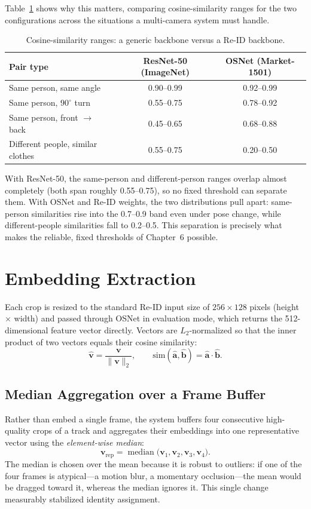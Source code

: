 \documentclass[12pt]{report}
\begin{document}
Table~\ref{tab:osnet_dist} shows why this matters, comparing cosine-similarity ranges for the two configurations across the situations a multi-camera system must handle.

\begin{table}[H]
\centering
\begin{tabularx}{\textwidth}{|X|c|c|}
\hline
\textbf{Pair type} & \textbf{ResNet-50 (ImageNet)} & \textbf{OSNet (Market-1501)} \\
\hline
Same person, same angle & 0.90--0.99 & 0.92--0.99 \\
\hline
Same person, $90^{\circ}$ turn & 0.55--0.75 & 0.78--0.92 \\
\hline
Same person, front $\rightarrow$ back & 0.45--0.65 & 0.68--0.88 \\
\hline
Different people, similar clothes & 0.55--0.75 & 0.20--0.50 \\
\hline
\end{tabularx}
\caption{Cosine-similarity ranges: a generic backbone versus a Re-ID backbone.}
\label{tab:osnet_dist}
\end{table}

With ResNet-50, the same-person and different-person ranges overlap almost completely (both span roughly 0.55--0.75), so no fixed threshold can separate them. With OSNet and Re-ID weights, the two distributions pull apart: same-person similarities rise into the 0.7--0.9 band even under pose change, while different-people similarities fall to 0.2--0.5. This separation is precisely what makes the reliable, fixed thresholds of Chapter~6 possible.

\section{Embedding Extraction}
Each crop is resized to the standard Re-ID input size of $256 \times 128$ pixels (height $\times$ width) and passed through OSNet in evaluation mode, which returns the 512-dimensional feature vector directly. Vectors are $L_2$-normalized so that the inner product of two vectors equals their cosine similarity:
\[
\hat{\mathbf{v}} = \frac{\mathbf{v}}{\lVert \mathbf{v} \rVert_2}, \qquad
\text{sim}(\hat{\mathbf{a}}, \hat{\mathbf{b}}) = \hat{\mathbf{a}} \cdot \hat{\mathbf{b}} .
\]

\subsection{Median Aggregation over a Frame Buffer}
Rather than embed a single frame, the system buffers four consecutive high-quality crops of a track and aggregates their embeddings into one representative vector using the \emph{element-wise median}:
\[
\mathbf{v}_{\text{rep}} = \operatorname{median}\big( \mathbf{v}_1, \mathbf{v}_2, \mathbf{v}_3, \mathbf{v}_4 \big).
\]
The median is chosen over the mean because it is robust to outliers: if one of the four frames is atypical---a motion blur, a momentary occlusion---the mean would be dragged toward it, whereas the median ignores it. This single change measurably stabilized identity assignment.
\end{document}
